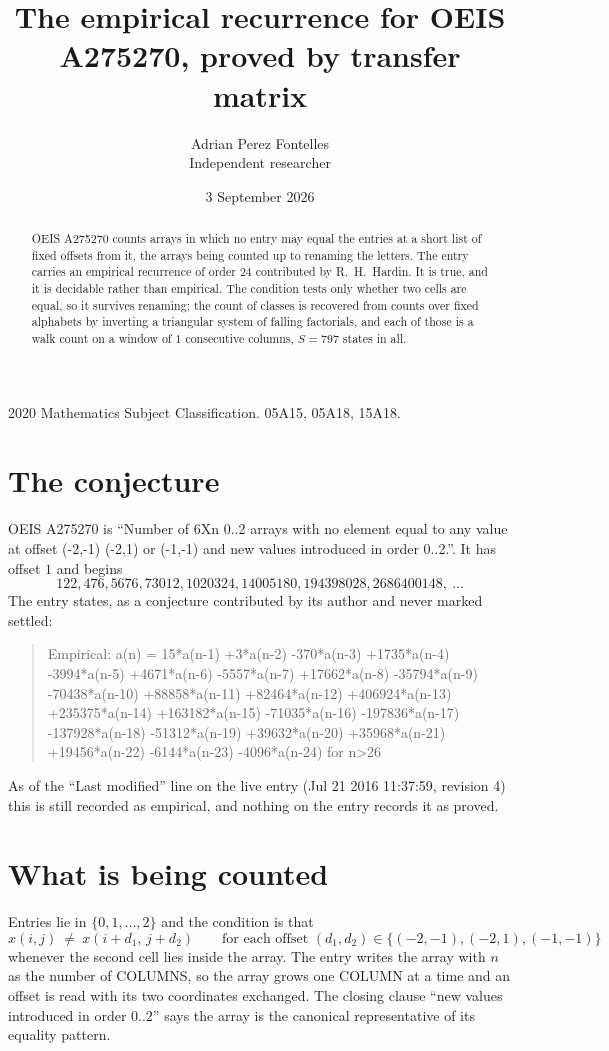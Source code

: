 \documentclass[11pt,a4paper]{article}
\title{The empirical recurrence for OEIS A275270, proved by transfer matrix}
\author{Adrian Perez Fontelles\\ \small Independent researcher}
\date{3 September 2026}
\theoremstyle{plain}
\theoremstyle{definition}
\begin{document}
\maketitle

\begin{abstract}
OEIS A275270 counts arrays in which no entry may equal the entries at a short list of fixed offsets
from it, the arrays being counted up to renaming the letters. The entry carries an empirical
recurrence of order $24$ contributed by R.~H.~Hardin. It is true, and it is decidable
rather than empirical. The condition tests only whether two cells are equal, so it survives
renaming; the count of classes is recovered from counts over fixed alphabets by inverting a
triangular system of falling factorials, and each of those is a walk count on a window of
$1$ consecutive columns, $S=797$ states in all.
\end{abstract}

\noindent\small 2020 Mathematics Subject Classification. 05A15, 05A18, 15A18.\normalsize

\section{The conjecture}

OEIS A275270 is ``Number of 6Xn 0..2 arrays with no element equal to any value at offset (-2,-1) (-2,1) or (-1,-1) and new values introduced in order 0..2.''. It has offset $1$ and begins
\[
122, 476, 5676, 73012, 1020324, 14005180, 194398028, 2686400148,\ \dots
\]
The entry states, as a conjecture contributed by its author and never marked settled:
\begin{quote}
Empirical: a(n) = 15*a(n-1) +3*a(n-2) -370*a(n-3) +1735*a(n-4) -3994*a(n-5) +4671*a(n-6) -5557*a(n-7) +17662*a(n-8) -35794*a(n-9) -70438*a(n-10) +88858*a(n-11) +82464*a(n-12) +406924*a(n-13) +235375*a(n-14) +163182*a(n-15) -71035*a(n-16) -197836*a(n-17) -137928*a(n-18) -51312*a(n-19) +39632*a(n-20) +35968*a(n-21) +19456*a(n-22) -6144*a(n-23) -4096*a(n-24) for n>26
\end{quote}
As of the ``Last modified'' line on the live entry (Jul 21 2016 11:37:59, revision 4) this is still
recorded as empirical, and nothing on the entry records it as proved.

\section{What is being counted}

Entries lie in $\{0,1,\dots,2\}$ and the condition is that
\[
x(i,j)\ \ne\ x(i+d_1,\,j+d_2)\qquad\text{for each offset }(d_1,d_2)\in\{(-2,-1), (-2,1), (-1,-1)\}
\]
whenever the second cell lies inside the array. The entry writes the array with $n$ as the number of COLUMNS, so the array grows one COLUMN at a time and an offset is read with its two coordinates exchanged. The closing clause ``new values
introduced in order $0..2$'' says the array is the canonical representative of its equality
pattern.
\end{document}
